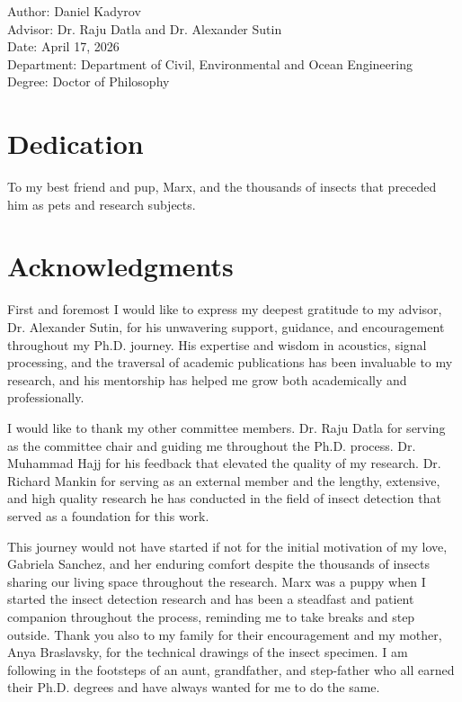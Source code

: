 \documentclass[11pt]{report}
\begin{document}
\vfill

Author: Daniel Kadyrov\\
Advisor: Dr. Raju Datla and Dr. Alexander Sutin\\
Date: April 17, 2026\\
Department: Department of Civil, Environmental and Ocean Engineering\\
Degree: Doctor of Philosophy

\chapter*{Dedication}

To my best friend and pup, Marx, and the thousands of insects that preceded him as pets and research subjects.

\chapter*{Acknowledgments}

First and foremost I would like to express my deepest gratitude to my advisor, Dr. Alexander Sutin, for his unwavering support, guidance, and encouragement throughout my Ph.D. journey. His expertise and wisdom in acoustics, signal processing, and the traversal of academic publications has been invaluable to my research, and his mentorship has helped me grow both academically and professionally.

I would like to thank my other committee members. Dr. Raju Datla for serving as the committee chair and guiding me throughout the Ph.D. process. Dr. Muhammad Hajj for his feedback that elevated the quality of my research. Dr. Richard Mankin for serving as an external member and the lengthy, extensive, and high quality research he has conducted in the field of insect detection that served as a foundation for this work. 

This journey would not have started if not for the initial motivation of my love, Gabriela Sanchez, and her enduring comfort despite the thousands of insects sharing our living space throughout the research. Marx was a puppy when I started the insect detection research and has been a steadfast and patient companion throughout the process, reminding me to take breaks and step outside. Thank you also to my family for their encouragement and my mother, Anya Braslavsky, for the technical drawings of the insect specimen. I am following in the footsteps of an aunt, grandfather, and step-father who all earned their Ph.D. degrees and have always wanted for me to do the same. 
\end{document}
